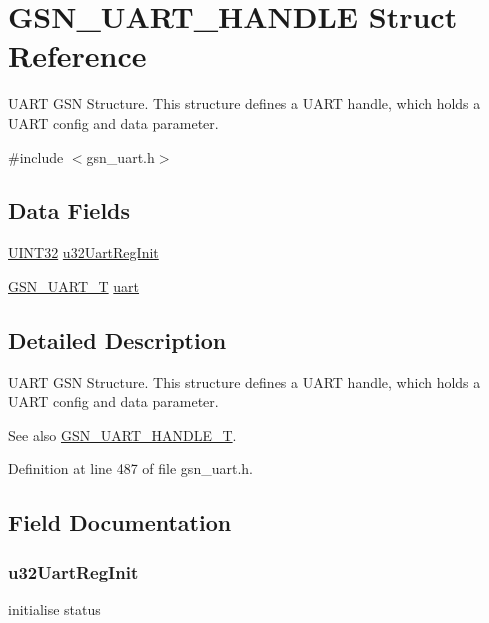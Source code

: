 \hypertarget{a00266}{
\section{GSN\_\-UART\_\-HANDLE Struct Reference}
\label{a00266}
}


UART GSN Structure. This structure defines a UART handle, which holds a UART config and data parameter.  




{\ttfamily \#include $<$gsn\_\-uart.h$>$}

\subsection*{Data Fields}
\begin{DoxyCompactItemize}
\item 
\hyperlink{a00660_gae1e6edbbc26d6fbc71a90190d0266018}{UINT32} \hyperlink{a00266_ac2068a5dcc04f5fa3d66a55460d89182}{u32UartRegInit}
\item 
\hyperlink{a00263}{GSN\_\-UART\_\-T} \hyperlink{a00266_aa86d9ef5b100af213cec79346dc9ce74}{uart}
\end{DoxyCompactItemize}


\subsection{Detailed Description}
UART GSN Structure. This structure defines a UART handle, which holds a UART config and data parameter. 

\begin{DoxySeeAlso}{See also}
\hyperlink{a00656_ga1e481438503e3525aaef5eb97517e75a}{GSN\_\-UART\_\-HANDLE\_\-T}. 
\end{DoxySeeAlso}


Definition at line 487 of file gsn\_\-uart.h.



\subsection{Field Documentation}
\hypertarget{a00266_ac2068a5dcc04f5fa3d66a55460d89182}{
\subsubsection[{u32UartRegInit}]{ {\bf u32UartRegInit}}}
\label{a00266_ac2068a5dcc04f5fa3d66a55460d89182}
initialise status 

